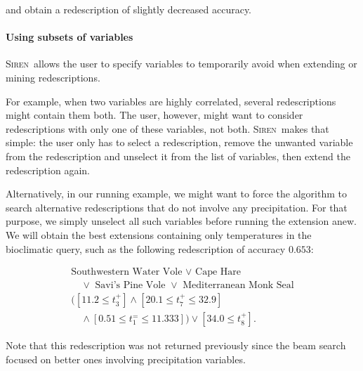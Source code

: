 \documentclass{sig-alternate}
\newcommand{\prg}[1]{\paragraph{#1}}
\newcommand{\Siren}{\textsc{Siren}}
\begin{document}
and obtain a redescription of slightly decreased accuracy. %

\prg{Using subsets of variables} 
\Siren\ allows the user to specify variables to temporarily 
avoid when extending or mining redescriptions.

For example, when two variables are highly
correlated, several redescriptions might contain them
both. The user, however, might want to consider
redescriptions with only one of these variables, not
both. \Siren\ makes that simple: the user only has to select a
redescription, remove the unwanted variable from the
redescription and unselect it from the list of variables, then extend the
redescription again. 

Alternatively, in our running example, we might want to force the
algorithm to search alternative redescriptions that do not involve any
 precipitation. For that purpose, we simply unselect all such
variables before running the extension anew. We will obtain the best
extensions containing only temperatures in the bioclimatic query, such
as the following redescription of accuracy $0.653$:

\begin{equation*}
\begin{array}{l}
\text{Southwestern Water Vole }\lor\text{ Cape Hare }\\[1mm]
\quad\lor\text{ Savi's Pine Vole }\lor\text{ Mediterranean Monk Seal}\\[3mm]
( [11.2 \leq t_{3}^{+}] \land  [20.1 \leq t_{7}^{+} \leq 32.9] \\[1mm] 
\quad \land  [0.51 \leq t_{1}^{=} \leq 11.333]) \lor  [34.0 \leq t_{8}^{+}].
\end{array}
\end{equation*}

Note that this redescription was not returned previously since the
beam search focused on better ones involving precipitation variables.


\end{document}
